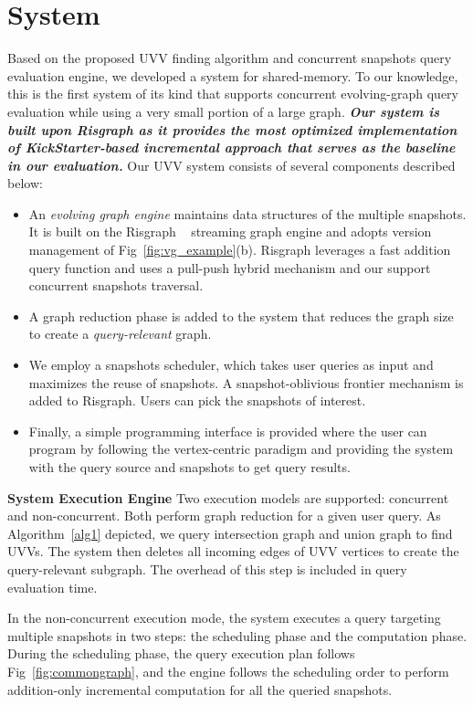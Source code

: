 \section{System}
Based on the proposed UVV finding algorithm and concurrent snapshots query evaluation engine, we developed a system for shared-memory. To our knowledge, this is the first system of its kind that supports concurrent evolving-graph query evaluation while using a very small portion of a large graph. \textbf{\emph{Our system is built upon Risgraph as it provides the most optimized implementation of KickStarter-based incremental approach that serves as the baseline in our evaluation.}} Our UVV system consists of several components described below:


\begin{itemize}
    \item An \emph{evolving graph engine} maintains data structures of the multiple snapshots. It is built on the Risgraph ~\cite{risgraph} streaming graph engine and adopts version management of Fig~\ref{fig:vg_example}(b). Risgraph leverages a fast addition query function and uses a pull-push hybrid mechanism and our support concurrent snapshots traversal.
    \item A graph reduction phase is added to the system that reduces the graph size to create a \emph{query-relevant} graph.
    \item We employ a snapshots scheduler, which takes user queries as input and maximizes the reuse of snapshots. A snapshot-oblivious frontier mechanism is added to Risgraph. Users can pick the snapshots of interest.
    \item Finally, a simple programming interface is provided where the user can program by following the vertex-centric paradigm and providing the system with the query source and snapshots to get query results.
\end{itemize}

\textbf{System Execution Engine} Two execution models are supported: concurrent and non-concurrent. Both perform graph reduction for a given user query. As Algorithm~\ref{alg1} depicted, we query intersection graph and union graph to find UVVs. The system then deletes all incoming edges of UVV vertices to create the query-relevant subgraph. The overhead of this step is included in query evaluation time.

In the non-concurrent execution mode, the system executes a query targeting multiple snapshots in two steps: the scheduling phase and the computation phase. During the scheduling phase, the query execution plan follows Fig~\ref{fig:commongraph}, and the engine follows the scheduling order to perform addition-only incremental computation for all the queried snapshots. %

